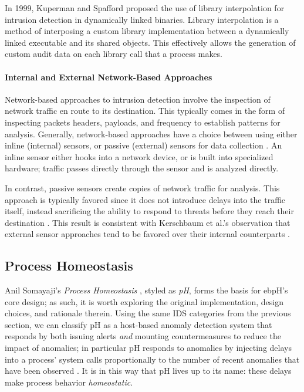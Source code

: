 \documentclass[
  12pt]{findlay}
\begin{document}
In 1999, Kuperman and Spafford \autocite{kuperman99} proposed the use of
library interpolation for intrusion detection in dynamically linked
binaries. Library interpolation is a method of interposing a custom
library implementation between a dynamically linked executable and its
shared objects. This effectively allows the generation of custom audit
data on each library call that a process makes.

\hypertarget{internal-and-external-network-based-approaches}{%
\paragraph{Internal and External Network-Based
Approaches}\label{internal-and-external-network-based-approaches}}

Network-based approaches \autocite{stallings07} to intrusion detection
involve the inspection of network traffic en route to its destination.
This typically comes in the form of inspecting packets headers,
payloads, and frequency to establish patterns for analysis. Generally,
network-based approaches have a choice between using either inline
(internal) sensors, or passive (external) sensors for data collection
\autocite{stallings07}. An inline sensor either hooks into a network
device, or is built into specialized hardware; traffic passes directly
through the sensor and is analyzed directly.

In contrast, passive sensors create copies of network traffic for
analysis. This approach is typically favored since it does not introduce
delays into the traffic itself, instead sacrificing the ability to
respond to threats before they reach their destination
\autocite{stallings07}. This result is consistent with Kerschbaum et
al.'s observation that external sensor approaches tend to be favored
over their internal counterparts \autocite{spafford02}.

\hypertarget{process-homeostasis}{%
\subsection{Process Homeostasis}\label{process-homeostasis}}

Anil Somayaji's \emph{Process Homeostasis} \autocite{soma02}, styled as
\emph{pH}, forms the basis for ebpH's core design; as such, it is worth
exploring the original implementation, design choices, and rationale
therein. Using the same IDS categories from the previous section, we can
classify pH as a host-based anomaly detection system that responds by
both issuing alerts \emph{and} mounting countermeasures to reduce the
impact of anomalies; in particular pH responds to anomalies by injecting
delays into a process' system calls proportionally to the number of
recent anomalies that have been observed \autocite{soma02}. It is in
this way that pH lives up to its name: these delays make process
behavior \emph{homeostatic}.
\end{document}
